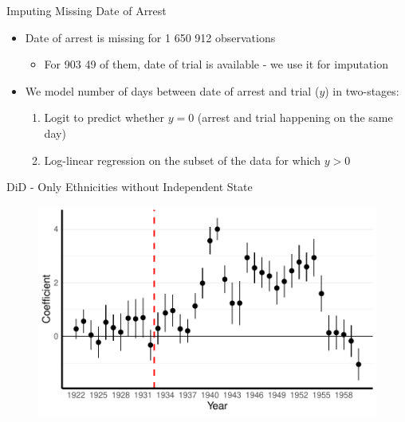 \documentclass[11pt]{beamer}
\begin{document}
\begin{frame}[label=arrest_date_imputation]{Imputing Missing Date of Arrest}
\begin{itemize}
    \item Date of arrest is missing for 1 650 912 observations 
    \begin{itemize}
        \item For 903 49 of them, date of trial is available - we use it for imputation
    \end{itemize}
    \item We model number of days between date of arrest and trial ($y$) in two-stages:
    \begin{enumerate}
        \item Logit to predict whether $y = 0$ (arrest and trial happening on the same day)
        \item  Log-linear regression on the subset of the data for which $y > 0$ 
    \end{enumerate}
\end{itemize}
\hyperlink{data}{}
\end{frame}


\begin{frame}[label=did_without_ind_state]{DiD - Only Ethnicities without Independent State}
 \begin{figure}[h]
\centering
\includegraphics[width=1\textwidth]{pr_cr2_date_imp_full_years_no_trends_not_ind_country.pdf}
\end{figure}

\hyperlink{robustness_checks}{}
\end{frame}
\end{document}
